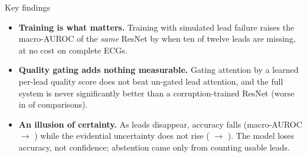 \begin{keybox}{Key findings}
\begin{itemize}\setlength{\itemsep}{2pt}\setlength{\leftmargin}{1em}
  \item \textbf{Training is what matters.} Training with simulated lead failure raises the macro-AUROC of the
        \emph{same} ResNet by \gainDropKTen{} when ten of twelve leads are missing, at no cost on complete ECGs.
  \item \textbf{Quality gating adds nothing measurable.} Gating attention by a learned per-lead quality score does
        not beat un-gated lead attention, and the full system is never significantly better than a
        corruption-trained ResNet (worse in \bootNSigNeg{} of \bootNRows{} comparisons).
  \item \textbf{An illusion of certainty.} As leads disappear, accuracy falls (macro-AUROC \aucLgEdlKZero{}
        $\rightarrow$ \aucLgEdlKTen) while the evidential uncertainty does not rise (\meanUKZero{} $\rightarrow$
        \meanUKTen). The model loses accuracy, not confidence; abstention came only from counting usable leads.
\end{itemize}
\end{keybox}
